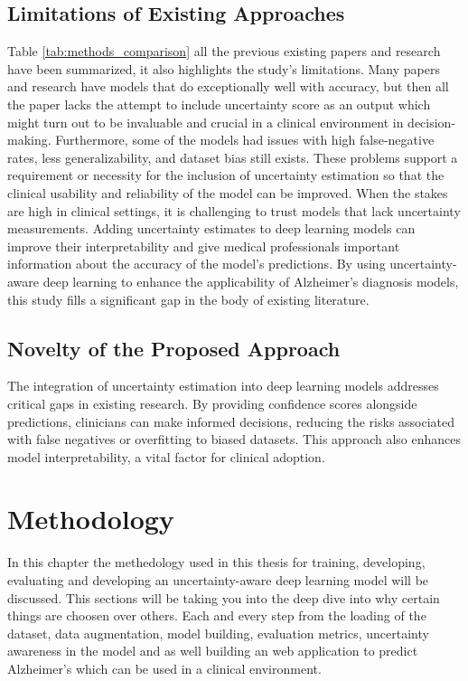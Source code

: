 \documentclass[12pt,onecolumn]{report}
\begin{document}
\section{Limitations of Existing Approaches}
Table \ref{tab:methods_comparison} all the previous existing papers and research have been summarized, it also highlights the study's limitations. Many papers and research have models that do exceptionally well with accuracy, but then all the paper lacks the attempt to include uncertainty score as an output which might turn out to be invaluable and crucial in a clinical environment in decision-making. Furthermore, some of the models had issues with high false-negative rates, less generalizability, and dataset bias still exists. These problems support a requirement or necessity for the inclusion of uncertainty estimation so that the clinical usability and reliability of the model can be improved. When the stakes are high in clinical settings, it is challenging to trust models that lack uncertainty measurements. Adding uncertainty estimates to deep learning models can improve their interpretability and give medical professionals important information about the accuracy of the model's predictions. By using uncertainty-aware deep learning to enhance the applicability of Alzheimer's diagnosis models, this study fills a significant gap in the body of existing literature.


\section{Novelty of the Proposed Approach}
The integration of uncertainty estimation into deep learning models addresses critical gaps in existing research. By providing confidence scores alongside predictions, clinicians can make informed decisions, reducing the risks associated with false negatives or overfitting to biased datasets. This approach also enhances model interpretability, a vital factor for clinical adoption.



\chapter{Methodology}

In this chapter the methedology used in this thesis for training, developing, evaluating and developing an uncertainty-aware deep learning model will be discussed. This sections will be taking you into the deep dive into why certain things are choosen over others. Each and every step from the loading of the dataset, data augmentation, model building, evaluation metrics, uncertainty awareness in the model and as well building an web application to predict Alzheimer's which can be used in a clinical environment.
\end{document}
